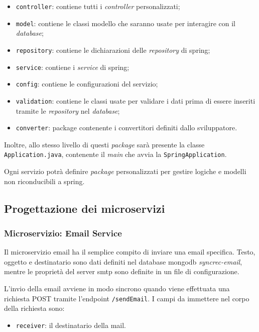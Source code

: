 \begin{itemize}
	\item \texttt{controller}: contiene tutti i \textit{controller} personalizzati;
	\item \texttt{model}: contiene le classi modello che saranno usate per interagire con il \textit{database};
	\item \texttt{repository}: contiene le dichiarazioni delle \textit{repository} di \gls{spring};
	\item \texttt{service}: contiene i \textit{service} di \gls{spring};
	\item \texttt{config}: contiene le configurazioni del servizio;
	\item \texttt{validation}: contiene le classi usate per validare i dati prima di essere inseriti tramite le \textit{repository} nel \textit{database};
	\item \texttt{converter}: package contenente i convertitori definiti dallo sviluppatore.
\end{itemize}

Inoltre, allo stesso livello di questi \textit{package} sarà presente la classe \texttt{Application.java}, contenente il \textit{main}
che avvia la \texttt{SpringApplication}.

Ogni servizio potrà definire \textit{package} personalizzati per gestire logiche e modelli non riconducibili a \gls{spring}.


\subsection{Progettazione dei microservizi}\label{prog-microservizi}

\subsubsection{Microservizio: Email Service}

Il \gls{microservizio} email ha il semplice compito di inviare una email specifica.
Testo, oggetto e destinatario sono dati definiti nel database \gls{mongodb}
\textit{syncrec-email}, mentre le proprietà del server \acrshort{smtp} sono definite in un file di configurazione.

L'invio della email avviene in modo sincrono quando viene effettuata una richiesta POST tramite l'endpoint \texttt{/sendEmail}.
I campi da immettere nel corpo della richiesta sono:
\begin{itemize}
	\item \texttt{receiver}: il destinatario della mail.
\end{itemize}

